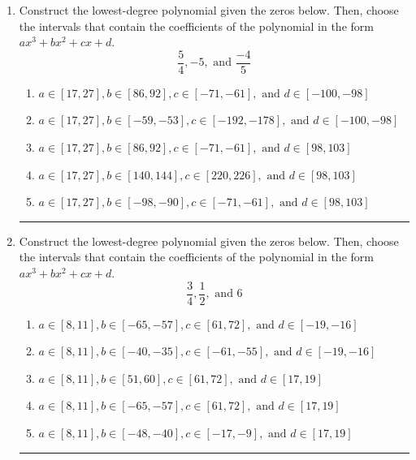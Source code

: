 \documentclass[14pt]{extbook}
\newcommand{\litem}[1]{\item#1\hspace*{-1cm}\rule{\textwidth}{0.4pt}}
\begin{document}
\begin{enumerate}
\litem{
Construct the lowest-degree polynomial given the zeros below. Then, choose the intervals that contain the coefficients of the polynomial in the form $ax^3+bx^2+cx+d$.\[ \frac{5}{4}, -5, \text{ and } \frac{-4}{5} \]\begin{enumerate}[label=\Alph*.]
\item \( a \in [17, 27], b \in [86, 92], c \in [-71, -61], \text{ and } d \in [-100, -98] \)
\item \( a \in [17, 27], b \in [-59, -53], c \in [-192, -178], \text{ and } d \in [-100, -98] \)
\item \( a \in [17, 27], b \in [86, 92], c \in [-71, -61], \text{ and } d \in [98, 103] \)
\item \( a \in [17, 27], b \in [140, 144], c \in [220, 226], \text{ and } d \in [98, 103] \)
\item \( a \in [17, 27], b \in [-98, -90], c \in [-71, -61], \text{ and } d \in [98, 103] \)

\end{enumerate} }
\litem{
Construct the lowest-degree polynomial given the zeros below. Then, choose the intervals that contain the coefficients of the polynomial in the form $ax^3+bx^2+cx+d$.\[ \frac{3}{4}, \frac{1}{2}, \text{ and } 6 \]\begin{enumerate}[label=\Alph*.]
\item \( a \in [8, 11], b \in [-65, -57], c \in [61, 72], \text{ and } d \in [-19, -16] \)
\item \( a \in [8, 11], b \in [-40, -35], c \in [-61, -55], \text{ and } d \in [-19, -16] \)
\item \( a \in [8, 11], b \in [51, 60], c \in [61, 72], \text{ and } d \in [17, 19] \)
\item \( a \in [8, 11], b \in [-65, -57], c \in [61, 72], \text{ and } d \in [17, 19] \)
\item \( a \in [8, 11], b \in [-48, -40], c \in [-17, -9], \text{ and } d \in [17, 19] \)


\end{enumerate}}
\end{enumerate}
\end{document}
